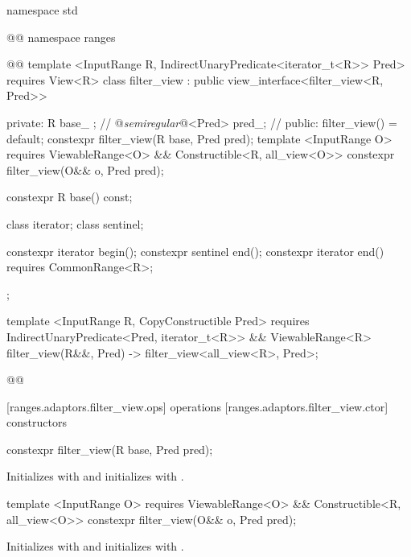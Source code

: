 \begin{codeblock}
namespace std { @@ namespace ranges { @@
  template <InputRange R, IndirectUnaryPredicate<iterator_t<R>> Pred>
    requires View<R>
  class filter_view : public view_interface<filter_view<R, Pred>> {
  private:
    R base_ {}; // \expos
    @\textit{semiregular}@<Pred> pred_; // \expos
  public:
    filter_view() = default;
    constexpr filter_view(R base, Pred pred);
    template <InputRange O>
      requires ViewableRange<O> && Constructible<R, all_view<O>>
    constexpr filter_view(O&& o, Pred pred);

    constexpr R base() const;

    class iterator;
    class sentinel;

    constexpr iterator begin();
    constexpr sentinel end();
    constexpr iterator end() requires CommonRange<R>;
  };

  template <InputRange R, CopyConstructible Pred>
    requires IndirectUnaryPredicate<Pred, iterator_t<R>> && ViewableRange<R>
  filter_view(R&&, Pred) -> filter_view<all_view<R>, Pred>;
}}@\removed{\}\}}@
\end{codeblock}

[ranges.adaptors.filter_view.ops]{ operations}
[ranges.adaptors.filter_view.ctor]{ constructors}

%
\begin{itemdecl}
constexpr filter_view(R base, Pred pred);
\end{itemdecl}

\begin{itemdescr}
\pnum
\effects Initializes  with  and initializes
 with .
\end{itemdescr}

%
\begin{itemdecl}
template <InputRange O>
  requires ViewableRange<O> && Constructible<R, all_view<O>>
constexpr filter_view(O&& o, Pred pred);
\end{itemdecl}

\begin{itemdescr}
\pnum
\effects Initializes  with 
and initializes  with .
\end{itemdescr}

